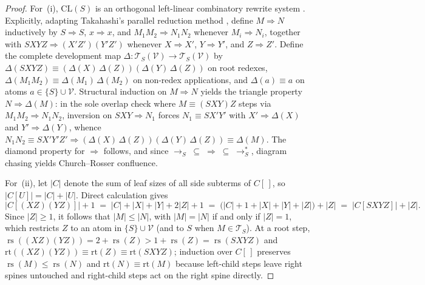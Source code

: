 \documentclass[11pt,reqno]{amsart}
\numberwithin{equation}{section}
\theoremstyle{plain}
\theoremstyle{definition}
\theoremstyle{remark}
\DeclareMathOperator{\rs}{rs}
\newcommand{\CLS}{\mathrm{CL}(S)}
\newcommand{\TS}{\mathcal{T}_S}
\newcommand{\TSV}{\mathcal{T}_S(\mathcal{V})}
\newcommand{\redS}{\to_S}
\newcommand{\redSs}{\to_S^*}
\begin{document}
\begin{proof}
For~(i), $\CLS$ is an orthogonal left-linear combinatory rewrite system \cite{Terese2003}. Explicitly, adapting Takahashi's parallel reduction method \cite{Takahashi1995}, define $M \Rightarrow N$ inductively by $S \Rightarrow S$, $x \Rightarrow x$, and $M_1 M_2 \Rightarrow N_1 N_2$ whenever $M_i \Rightarrow N_i$, together with $S X Y Z \Rightarrow (X' Z')(Y' Z')$ whenever $X \Rightarrow X'$, $Y \Rightarrow Y'$, and $Z \Rightarrow Z'$. Define the complete development map $\Delta \colon \TSV \to \TSV$ by $\Delta(S X Y Z) \equiv (\Delta(X)\,\Delta(Z))(\Delta(Y)\,\Delta(Z))$ on root redexes, $\Delta(M_1 M_2) \equiv \Delta(M_1)\,\Delta(M_2)$ on non-redex applications, and $\Delta(a) \equiv a$ on atoms $a \in \{S\} \cup \mathcal{V}$. Structural induction on $M \Rightarrow N$ yields the triangle property $N \Rightarrow \Delta(M)$: in the sole overlap check where $M \equiv (S X Y) Z$ steps via $M_1 M_2 \Rightarrow N_1 N_2$, inversion on $S X Y \Rightarrow N_1$ forces $N_1 \equiv S X' Y'$ with $X' \Rightarrow \Delta(X)$ and $Y' \Rightarrow \Delta(Y)$, whence $N_1 N_2 \equiv S X' Y' Z' \Rightarrow (\Delta(X)\,\Delta(Z))(\Delta(Y)\,\Delta(Z)) \equiv \Delta(M)$. The diamond property for $\Rightarrow$ follows, and since $\redS \;\subseteq\; \Rightarrow \;\subseteq\; \redSs$, diagram chasing yields Church--Rosser confluence.

For~(ii), let $|C|$ denote the sum of leaf sizes of all side subterms of $C[\,]$, so $|C[U]| = |C| + |U|$. Direct calculation gives
\[
  |C[(X Z)(Y Z)]| + 1 \;=\; |C| + |X| + |Y| + 2|Z| + 1 \;=\; \bigl(|C| + 1 + |X| + |Y| + |Z|\bigr) + |Z| \;=\; |C[S X Y Z]| + |Z|.
\]
Since $|Z| \ge 1$, it follows that $|M| \le |N|$, with $|M| = |N|$ if and only if $|Z| = 1$, which restricts $Z$ to an atom in $\{S\} \cup \mathcal{V}$ (and to $S$ when $M \in \TS$). At a root step, $\rs((X Z)(Y Z)) = 2 + \rs(Z) > 1 + \rs(Z) = \rs(S X Y Z)$ and $\mathrm{rt}((X Z)(Y Z)) \equiv \mathrm{rt}(Z) \equiv \mathrm{rt}(S X Y Z)$; induction over $C[\,]$ preserves $\rs(M) \le \rs(N)$ and $\mathrm{rt}(N) \equiv \mathrm{rt}(M)$ because left-child steps leave right spines untouched and right-child steps act on the right spine directly.


\end{proof}
\end{document}

